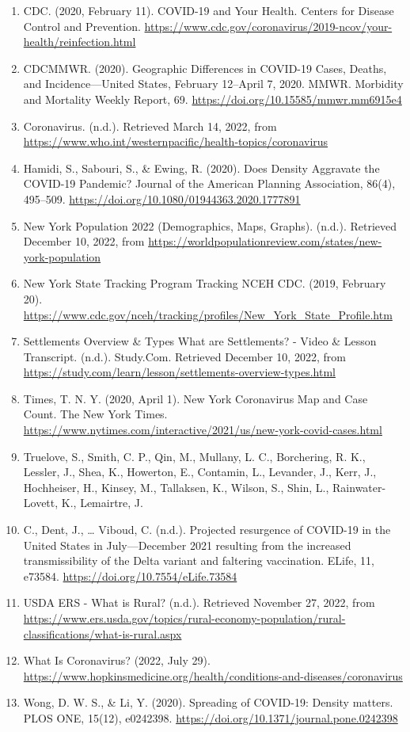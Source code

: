 \documentclass[
  12pt,
]{article}
\begin{document}
\begin{enumerate}
\def\labelenumi{\arabic{enumi}.}
\item
  CDC. (2020, February 11). COVID-19 and Your Health. Centers for
  Disease Control and Prevention.
  \url{https://www.cdc.gov/coronavirus/2019-ncov/your-health/reinfection.html}
\item
  CDCMMWR. (2020). Geographic Differences in COVID-19 Cases, Deaths, and
  Incidence---United States, February 12--April 7, 2020. MMWR. Morbidity
  and Mortality Weekly Report, 69.
  \url{https://doi.org/10.15585/mmwr.mm6915e4}
\item
  Coronavirus. (n.d.). Retrieved March 14, 2022, from
  \url{https://www.who.int/westernpacific/health-topics/coronavirus}
\item
  Hamidi, S., Sabouri, S., \& Ewing, R. (2020). Does Density Aggravate
  the COVID-19 Pandemic? Journal of the American Planning Association,
  86(4), 495--509. \url{https://doi.org/10.1080/01944363.2020.1777891}
\item
  New York Population 2022 (Demographics, Maps, Graphs). (n.d.).
  Retrieved December 10, 2022, from
  \url{https://worldpopulationreview.com/states/new-york-population}
\item
  New York State Tracking Program \textbar{} Tracking \textbar{} NCEH
  \textbar{} CDC. (2019, February 20).
  \url{https://www.cdc.gov/nceh/tracking/profiles/New_York_State_Profile.htm}
\item
  Settlements Overview \& Types \textbar{} What are Settlements? - Video
  \& Lesson Transcript. (n.d.). Study.Com. Retrieved December 10, 2022,
  from
  \url{https://study.com/learn/lesson/settlements-overview-types.html}
\item
  Times, T. N. Y. (2020, April 1). New York Coronavirus Map and Case
  Count. The New York Times.
  \url{https://www.nytimes.com/interactive/2021/us/new-york-covid-cases.html}
\item
  Truelove, S., Smith, C. P., Qin, M., Mullany, L. C., Borchering, R.
  K., Lessler, J., Shea, K., Howerton, E., Contamin, L., Levander, J.,
  Kerr, J., Hochheiser, H., Kinsey, M., Tallaksen, K., Wilson, S., Shin,
  L., Rainwater-Lovett, K., Lemairtre, J.
\item
  C., Dent, J., \ldots{} Viboud, C. (n.d.). Projected resurgence of
  COVID-19 in the United States in July---December 2021 resulting from
  the increased transmissibility of the Delta variant and faltering
  vaccination. ELife, 11, e73584.
  \url{https://doi.org/10.7554/eLife.73584}
\item
  USDA ERS - What is Rural? (n.d.). Retrieved November 27, 2022, from
  \url{https://www.ers.usda.gov/topics/rural-economy-population/rural-classifications/what-is-rural.aspx}
\item
  What Is Coronavirus? (2022, July 29).
  \url{https://www.hopkinsmedicine.org/health/conditions-and-diseases/coronavirus}
\item
  Wong, D. W. S., \& Li, Y. (2020). Spreading of COVID-19: Density
  matters. PLOS ONE, 15(12), e0242398.
  \url{https://doi.org/10.1371/journal.pone.0242398}
\end{enumerate}
\end{document}
